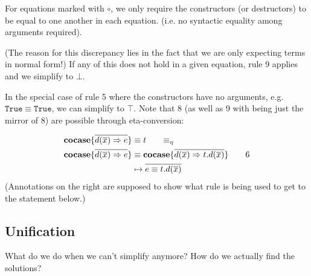 \documentclass[twoside,12pt,a4paper]{article}
\begin{document}
For equations marked with $\circ$, we only require the constructors (or destructors) to be equal to one another in each equation. 
(i.e. no syntactic equality among arguments required).

(The reason for this discrepancy lies in the fact that we are only expecting terms in normal form!)
If any of this does not hold in a given equation, rule 9 applies and we simplify to $\bot$.

In the special case of rule 5 where the constructors have no arguments, e.g. $\mathtt{True \equiv True}$, we can simplify to $\top$.
Note that 8 (as well as 9 with being just the mirror of 8) are possible through eta-conversion:

\begin{align*}
    \excopatmatch{\overline{d(\overline{x})\Rightarrow e}}&\equiv t \tag*{$\equiv_{\eta}$}\\
    \excopatmatch{\overline{d(\overline{x})\Rightarrow e}}&\equiv \excopatmatch{\overline{d(\overline{x})\Rightarrow t.d(\overline{x})}} \tag*{6}\\
    &\mapsto \overline{e \equiv t.d(\overline{x})}
\end{align*}
(Annotations on the right are supposed to show what rule is being used to get to the statement below.)

\subsection{Unification}

What do we do when we can't simplify anymore? How do we actually find the solutions?
\end{document}

